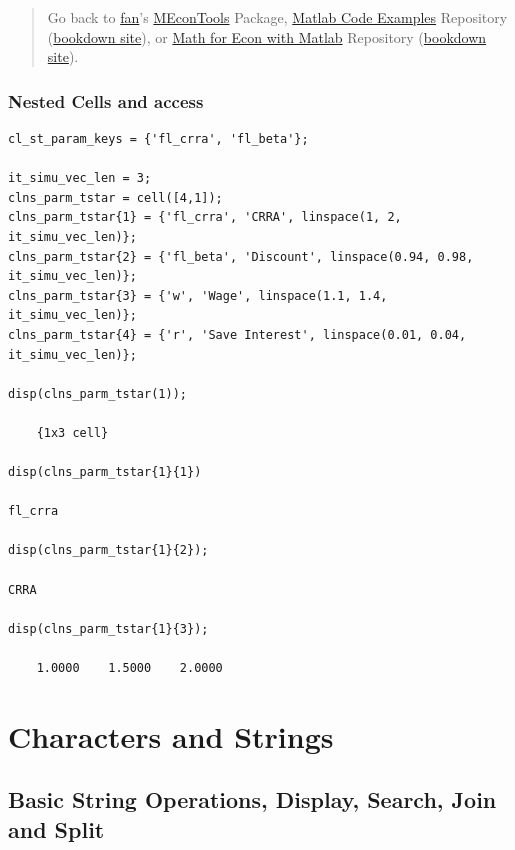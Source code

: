 \documentclass[
]{book}
\begin{document}
\begin{quote}
Go back to \href{http://fanwangecon.github.io/}{fan}'s \href{https://fanwangecon.github.io/MEconTools/}{MEconTools} Package, \href{https://fanwangecon.github.io/M4Econ/}{Matlab Code Examples} Repository (\href{https://fanwangecon.github.io/M4Econ/bookdown}{bookdown site}), or \href{https://fanwangecon.github.io/Math4Econ/}{Math for Econ with Matlab} Repository (\href{https://fanwangecon.github.io/Math4Econ/bookdown}{bookdown site}).
\end{quote}

\hypertarget{nested-cells-and-access}{%
\subsubsection{Nested Cells and access}\label{nested-cells-and-access}}

\begin{verbatim}
cl_st_param_keys = {'fl_crra', 'fl_beta'};

it_simu_vec_len = 3;
clns_parm_tstar = cell([4,1]);
clns_parm_tstar{1} = {'fl_crra', 'CRRA', linspace(1, 2, it_simu_vec_len)};
clns_parm_tstar{2} = {'fl_beta', 'Discount', linspace(0.94, 0.98, it_simu_vec_len)};
clns_parm_tstar{3} = {'w', 'Wage', linspace(1.1, 1.4, it_simu_vec_len)};
clns_parm_tstar{4} = {'r', 'Save Interest', linspace(0.01, 0.04, it_simu_vec_len)};

disp(clns_parm_tstar(1));

    {1x3 cell}

disp(clns_parm_tstar{1}{1})

fl_crra

disp(clns_parm_tstar{1}{2});

CRRA

disp(clns_parm_tstar{1}{3});

    1.0000    1.5000    2.0000
\end{verbatim}

\hypertarget{characters-and-strings}{%
\section{Characters and Strings}\label{characters-and-strings}}

\hypertarget{basic-string-operations-display-search-join-and-split}{%
\subsection{Basic String Operations, Display, Search, Join and Split}\label{basic-string-operations-display-search-join-and-split}}
\end{document}
